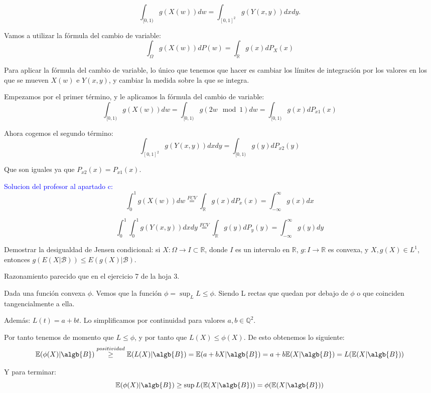 \begin{problem}[1]
$$\int_{ [0,1)} g(X(w)) dw = \int_{ [0,1]^2} g(Y(x,y)) dx dy.$$

Vamos a utilizar la fórmula del cambio de variable:
\[
\int_{\Omega}g(X(w))dP(w)=\int_{\mathbb{R}}g(x)dP_X(x)
\]

Para aplicar la fórmula del cambio de variable, lo único que tenemos que hacer es cambiar los límites de integración por los valores en los que se mueven $X(w)$ e $Y(x,y)$, y cambiar la medida sobre la que se integra.

Empezamos por el primer término, y le aplicamos la fórmula del cambio de variable:
$$\int_{ [0,1)} g(X(w)) dw = \int_{ [0,1)} g(2w \mod{1}) dw= \int_{ [0,1)} g(x) dP_{x1}(x)$$

Ahora cogemos el segundo término:
$$\int_{ [0,1]^2} g(Y(x,y)) dx dy = \int_{ [0,1)} g(y) dP_{x2}(y)$$

Que son iguales ya que $P_{x2}(x) = P_{x1}(x)$.

\textcolor{blue}{Solucion del profesor al apartado c:}
\[
\int_0^1 g(X(w)) dw \stackrel{FCV}{=} \int_{\mathbb{R}}g(x)dP_x(x)= \int_{-\infty}^{\infty}g(x)dx
\]

\[
\int_0^1 \int_0^1 g(Y(x,y))dxdy \stackrel{FCV}{=} \int_{\mathbb{R}}g(y)dP_y(y)= \int_{-\infty}^{\infty}g(y)dy
\]

\end{problem}


\begin{problem}[2] Demostrar la desigualdad de Jensen condicional: si $X:\Omega\to I\subset \mathbb{R}$, donde
$I$ es un intervalo en $\mathbb{R}$, $g:I\to \mathbb{R}$ es convexa, y $X, g(X) \in L^1$, entonces
 $g(E(X|\mathcal{B})) \le E(g(X)|\mathcal{B})$. 

\solution

\begin{expla}
Razonamiento parecido que en el ejercicio 7 de la hoja 3.
\end{expla}
Dada una función convexa $\phi$. Vemos que la función $\phi=\sup_{L} {L \leq \phi}$. Siendo L rectas que quedan por debajo de $\phi$ o que coinciden tangencialmente a ella.

Además: $L(t)=a+bt$. Lo simplificamos por continuidad para valores $a,b \in \mathbb{Q}^2$.

Por tanto tenemos de momento que $L \leq \phi$, y por tanto que $L(X) \leq \phi(X)$. De esto obtenemos lo siguiente:
\[
\mathbb{E}(\phi(X)|\algb{B}) \stackrel{positividad}{\geq} \mathbb{E}(L(X)|\algb{B}) = \mathbb{E}(a+bX|\algb{B}) = a+b\mathbb{E}(X|\algb{B}) = L(\mathbb{E}(X|\algb{B}))
\]

Y para terminar:
\[
\mathbb{E}(\phi(X)|\algb{B}) \geq \sup L(\mathbb{E}(X|\algb{B}))=\phi(\mathbb{E}(X|\algb{B}))
\]


\end{problem}


